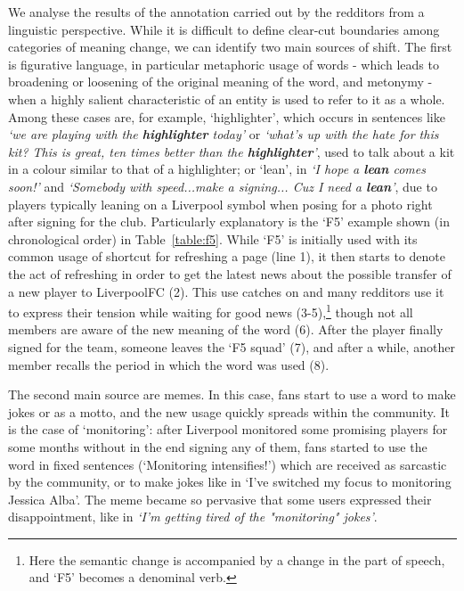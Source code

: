 We analyse the results of the annotation carried out by the redditors from a linguistic perspective. While it is difficult to define clear-cut boundaries among categories of meaning change, we can identify two main sources of shift. The first is figurative language, in particular metaphoric usage of words - which leads to broadening or loosening of the original meaning of the word, and metonymy - when a highly salient characteristic of an entity is used to refer to it as a whole. Among these cases are, for example, `highlighter', which occurs in sentences like \textit{`we are playing with the \textbf{highlighter} today'} or \textit{`what's up with the hate for this kit? This is great, ten times better than the \textbf{highlighter}'}, used to talk about a kit in a colour similar to that of a highlighter; or `lean', in \textit{`I hope a \textbf{lean} comes soon!'} and \textit{`Somebody with speed...make a signing... Cuz I need a \textbf{lean}'}, due to players typically leaning on a Liverpool symbol when posing for a photo right after signing for the club. Particularly explanatory is the `F5' example shown (in chronological order) in
Table~\ref{table:f5}. While `F5' is initially used with its common usage of shortcut for refreshing a page (line 1), it then starts to denote the act of refreshing in order to get the latest news about the possible transfer of a new player to LiverpoolFC (2). This use catches on and many redditors use it to express their tension while waiting for good news (3-5),\footnote{Here the semantic change is accompanied by a change in the part of speech, and `F5' becomes a denominal verb.}
though not all members are aware of the new meaning of the word (6). After the player finally signed for the team, someone leaves the `F5 squad' (7), and after a while, another member recalls the period in which the word was used (8).

The second main source are memes. In this case, fans start to use a word to make jokes or as a motto, and the new usage quickly spreads within the community. It is the case of `monitoring': after Liverpool monitored some promising players for some months without in the end signing any of them, fans started to use the word in fixed sentences (`Monitoring intensifies!') which are received as sarcastic by the community, or to make jokes like in `I've switched my focus to monitoring Jessica Alba'. The meme became so pervasive that some users expressed their disappointment, like in \textit{`I'm getting tired of the "monitoring" jokes'}. 

